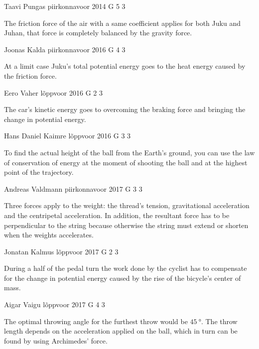 \documentclass[11pt]{article}
\begin{document}
{Taavi Pungas} %
{piirkonnavoor} %
{2014} %
{G 5} %
{3} %
{

\ifEngHint
The friction force of the air with a same coefficient applies for both Juku and Juhan, that force is completely balanced by the gravity force.
\fi
}

{Joonas Kalda} %
{piirkonnavoor} %
{2016} %
{G 4} %
{3} %
{

\ifEngHint
At a limit case Juku’s total potential energy goes to the heat energy caused by the friction force.
\fi
}

{Eero Vaher} %
{lõppvoor} %
{2016} %
{G 2} %
{3} %
{

\ifEngHint
The car’s kinetic energy goes to overcoming the braking force and bringing the change in potential energy.
\fi
}

{Hans Daniel Kaimre} %
{lõppvoor} %
{2016} %
{G 3} %
{3} %
{

\ifEngHint
To find the actual height of the ball from the Earth’s ground, you can use the law of conservation of energy at the moment of shooting the ball and at the highest point of the trajectory.
\fi
}

{Andreas Valdmann} %
{piirkonnavoor} %
{2017} %
{G 3} %
{3} %
{

\ifEngHint
Three forces apply to the weight: the thread’s tension, gravitational acceleration and the centripetal acceleration. In addition, the resultant force has to be perpendicular to the string because otherwise the string must extend or shorten when the weights accelerates.
\fi
}

{Jonatan Kalmus} %
{lõppvoor} %
{2017} %
{G 2} %
{3} %
{

\ifEngHint
During a half of the pedal turn the work done by the cyclist has to compensate for the change in potential energy caused by the rise of the bicycle’s center of mass.
\fi
}

{Aigar Vaigu} %
{lõppvoor} %
{2017} %
{G 4} %
{3} %
{

\ifEngHint
The optimal throwing angle for the furthest throw would be $\SI{45}{\degree}$. The throw length depends on the acceleration applied on the ball, which in turn can be found by using Archimedes’ force.
\fi
}
\end{document}
